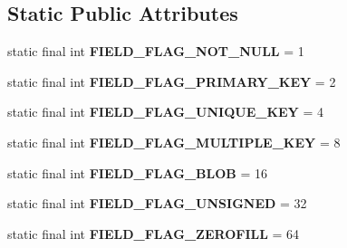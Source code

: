 \subsection*{Static Public Attributes}
\begin{DoxyCompactItemize}
\item 
\mbox{\label{enumcom_1_1mysql_1_1cj_1_1_mysql_type_a46a9fa53a19cf146d0a24cc47e1cb41f}} 
static final int {\bfseries F\+I\+E\+L\+D\+\_\+\+F\+L\+A\+G\+\_\+\+N\+O\+T\+\_\+\+N\+U\+LL} = 1
\item 
\mbox{\label{enumcom_1_1mysql_1_1cj_1_1_mysql_type_afa431b700b411009900c1afe8017ab1c}} 
static final int {\bfseries F\+I\+E\+L\+D\+\_\+\+F\+L\+A\+G\+\_\+\+P\+R\+I\+M\+A\+R\+Y\+\_\+\+K\+EY} = 2
\item 
\mbox{\label{enumcom_1_1mysql_1_1cj_1_1_mysql_type_af918093f9f3d51e96214da1cbd311a34}} 
static final int {\bfseries F\+I\+E\+L\+D\+\_\+\+F\+L\+A\+G\+\_\+\+U\+N\+I\+Q\+U\+E\+\_\+\+K\+EY} = 4
\item 
\mbox{\label{enumcom_1_1mysql_1_1cj_1_1_mysql_type_aec1860d4e7c1d1a65fa299ea9704c9d2}} 
static final int {\bfseries F\+I\+E\+L\+D\+\_\+\+F\+L\+A\+G\+\_\+\+M\+U\+L\+T\+I\+P\+L\+E\+\_\+\+K\+EY} = 8
\item 
\mbox{\label{enumcom_1_1mysql_1_1cj_1_1_mysql_type_ada7ab8554e0037f2782e4c577fb0ab3c}} 
static final int {\bfseries F\+I\+E\+L\+D\+\_\+\+F\+L\+A\+G\+\_\+\+B\+L\+OB} = 16
\item 
\mbox{\label{enumcom_1_1mysql_1_1cj_1_1_mysql_type_a2c6701614559b1ad9955cdc4ca6337e2}} 
static final int {\bfseries F\+I\+E\+L\+D\+\_\+\+F\+L\+A\+G\+\_\+\+U\+N\+S\+I\+G\+N\+ED} = 32
\item 
\mbox{\label{enumcom_1_1mysql_1_1cj_1_1_mysql_type_abb76a1f2f3dac9a30d1b559b8ba66a48}} 
static final int {\bfseries F\+I\+E\+L\+D\+\_\+\+F\+L\+A\+G\+\_\+\+Z\+E\+R\+O\+F\+I\+LL} = 64
\item 
\mbox{\label{enumcom_1_1mysql_1_1cj_1_1_mysql_type_a10fbfe5535ddc1ed2bcbbb445fd48c91}} 

\end{DoxyCompactItemize}
